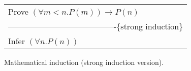 \begin{figure}
\begin{spacing}{0.9}
\begin{tabular}{l}
Prove $(\forall m<n.P(m))\rightarrow P(n)$ \\
----------------------------------------\{strong induction\}\\
Infer $(\forall n.P(n))$
\end{tabular}
\end{spacing}
\caption{Mathematical induction (strong induction version).}
\label{strong-induction-rule}
\end{figure}

